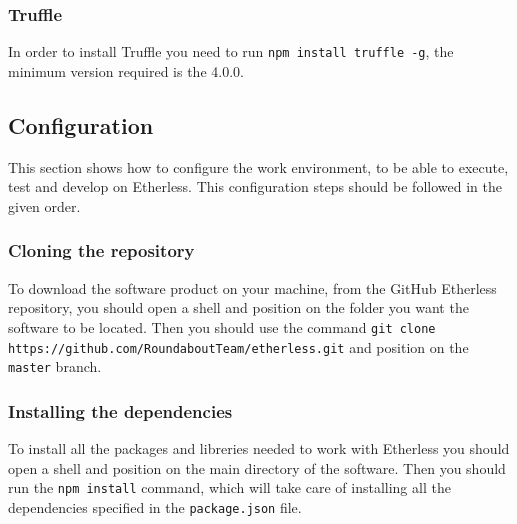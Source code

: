 \subsubsection{Truffle}
 In order to install Truffle you need to run \texttt{npm install truffle -g}, the minimum version required is the 4.0.0.
\subsection{Configuration}
This section shows how to configure the work environment, to be able to execute, test and develop on Etherless. This configuration steps should be followed in the given order.
\subsubsection{Cloning the repository}
To download the software product on your machine, from the GitHub Etherless repository, you should open a shell and position on the folder you want the software to be located. Then you should use the command \texttt{git clone https://github.com/RoundaboutTeam/etherless.git} and position on the \texttt{master} branch.
\subsubsection{Installing the dependencies}
To install all the packages and libreries needed to work with Etherless you should open a shell and position on the main directory of the software. Then you should run the \texttt{npm install} command, which will take care of installing all the dependencies specified in the \texttt{package.json} file.
